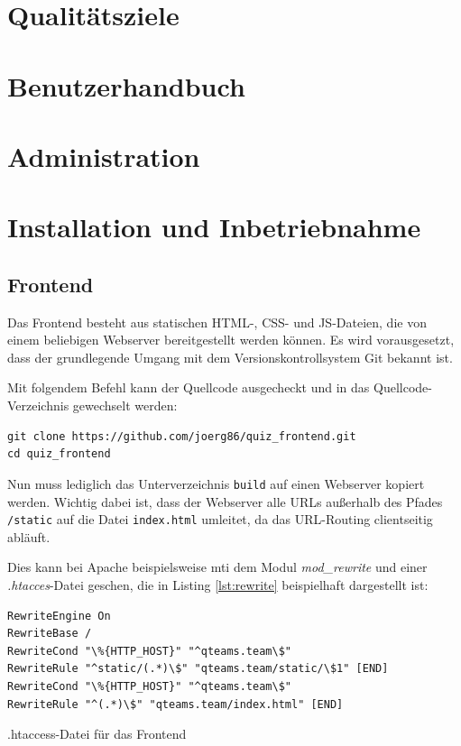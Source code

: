 \documentclass[a4paper,11pt,listof=numbered,glossary=totoc,parskip=half,toc=bib]{scrreprt}
\begin{document}
\begin{appendices}
		
			
		
		
		
	
	\chapter{Qualitätsziele}
	\chapter{Benutzerhandbuch}
	\chapter{Administration}
	
	\chapter{Installation und Inbetriebnahme}
	
	\section{Frontend}
	
	Das Frontend besteht aus statischen HTML-, CSS- und JS-Dateien, die von einem beliebigen Webserver bereitgestellt werden können.
	Es wird vorausgesetzt, dass der grundlegende Umgang mit dem Versionskontrollsystem Git bekannt ist.
	
	Mit folgendem Befehl kann der Quellcode ausgecheckt und in das Quellcode-Verzeichnis gewechselt werden:		
	\begin{verbatim}
git clone https://github.com/joerg86/quiz_frontend.git
cd quiz_frontend
	\end{verbatim}
	
	Nun muss lediglich das Unterverzeichnis \texttt{build} auf einen Webserver kopiert werden. Wichtig dabei ist, dass der Webserver alle URLs außerhalb des Pfades \texttt{/static} auf die Datei \texttt{index.html} umleitet, da das URL-Routing clientseitig abläuft.
	
	Dies kann bei Apache beispielsweise mti dem Modul \textit{mod\_{}rewrite} und einer \textit{.htacces}-Datei geschen, die in Listing \ref{lst:rewrite} beispielhaft dargestellt ist:
	\begin{listing}
	\begin{verbatim}
RewriteEngine On
RewriteBase /
RewriteCond "\%{HTTP_HOST}" "^qteams.team\$" 
RewriteRule "^static/(.*)\$" "qteams.team/static/\$1" [END]
RewriteCond "\%{HTTP_HOST}" "^qteams.team\$" 
RewriteRule "^(.*)\$" "qteams.team/index.html" [END]
	\end{verbatim}
		\caption{.htaccess-Datei für das Frontend}
		\label{lst:rewrite}
	\end{listing}
	

\end{appendices}
\end{document}
